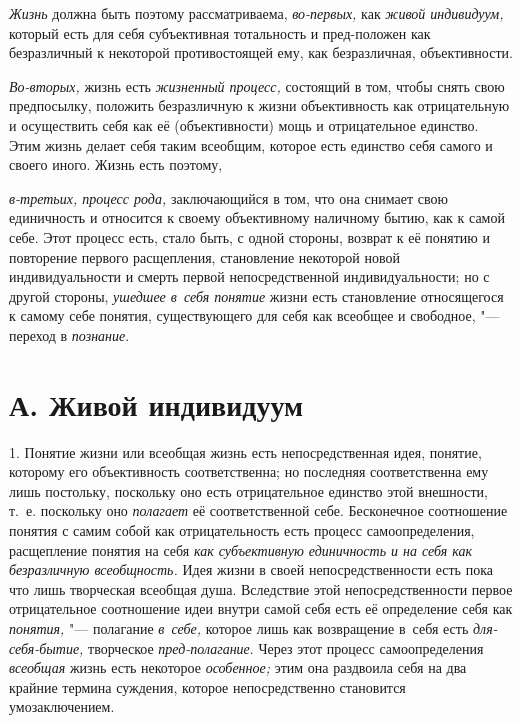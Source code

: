 {\em Жизнь} должна быть поэтому рассматриваема, {\em во-первых,} как {\em живой
индивидуум,} который есть для себя субъективная тотальность и пред-положен как
безразличный к некоторой противостоящей ему, как безразличная, объективности.

{\em Во-вторых,} жизнь есть {\em жизненный процесс,} состоящий в том, чтобы
снять свою предпосылку, положить безразличную к жизни объективность как
отрицательную и осуществить себя как её (объективности) мощь и отрицательное
единство. Этим жизнь делает себя таким всеобщим, которое есть единство себя
самого и своего иного. Жизнь есть поэтому,

{\em в-третьих, процесс рода,} заключающийся в том, что она снимает свою
единичность и относится к своему объективному наличному бытию, как к самой
себе. Этот процесс есть, стало быть, с одной стороны, возврат к её понятию и
повторение первого расщепления, становление некоторой новой индивидуальности и
смерть первой непосредственной индивидуальности; но с другой стороны,
{\em ушедшее в~себя понятие} жизни есть становление относящегося к самому себе
понятия, существующего для себя как всеобщее и свободное, "--- переход
в {\em познание}.

\section[А. Живой индивидуум]{А. Живой индивидуум}

1. Понятие жизни или всеобщая жизнь есть непосредственная
идея, понятие, которому его объективность соответственна; но последняя
соответственна ему лишь постольку, поскольку оно есть отрицательное
единство этой внешности, т.~е. поскольку оно
{\em полагает} её
соответственной себе. Бесконечное соотношение понятия с самим собой как
отрицательность есть процесс самоопределения, расщепление понятия на себя
{\em как субъективную единичность и на
себя как безразличную всеобщность.} Идея жизни в своей
непосредственности есть пока что лишь творческая всеобщая душа. Вследствие
этой непосредственности первое отрицательное соотношение идеи внутри самой
себя есть её определение себя как {\em понятия,} "--- полагание
{\em в~себе,} которое лишь как возвращение в~себя есть {\em для-себя-бытие,}
творческое {\em пред-полагание}. Через этот процесс самоопределения
{\em всеобщая} жизнь есть некоторое {\em особенное;}
этим она раздвоила себя на два крайние термина суждения,
которое непосредственно становится умозаключением.

